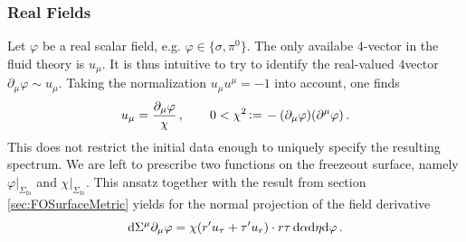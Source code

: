 \subsubsection{Real Fields}
\label{sec:FluidFromRealScalar}

Let $\varphi$ be a real scalar field, e.g. ${\varphi\in\{\sigma,\pi^0\}}$. The only availabe $4$-vector in the fluid theory is $u_\mu$. It is thus intuitive to try to identify the real-valued $4$vector ${\partial_\mu\varphi\sim u_\mu}$. Taking the normalization ${u_\mu u^\mu=-1}$ into account, one finds
\begin{equation}
    u_\mu=\frac{\partial_\mu\varphi}{\chi}\,,\qquad0<\chi^2{\,\vcentcolon=\,}-(\partial_\mu\varphi)(\partial^\mu\varphi)\,.
\end{equation}
This does not restrict the initial data enough to uniquely specify the resulting spectrum. We are left to prescribe two functions on the freezeout surface, namely $\varphi\vert_{\Sigma_{\text{fo}}}$ and $\chi\vert_{\Sigma_{\text{fo}}}$. This ansatz together with the result from section \ref{sec:FOSurfaceMetric} yields for the normal projection of the field derivative
\begin{equation}
    \text{d}\Sigma^\mu\partial_\mu\varphi=\chi(r^\prime u_\tau+\tau^\prime u_r)\cdot r\tau\,\text{d}\alpha\text{d}\eta\text{d}\varphi\,.
\end{equation}

